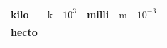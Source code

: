 {\begin{tabular}[t]{|l|l|l|l|l|l|}
        
                \textbf{kilo}
               &
    
    
        k &
    
    
        
                \begin{math}{10}^{3}\end{math}
               &
    
    
        
                \textbf{milli}
               &
    
    
        m &
    
    
        
                \begin{math}{10}^{-3}\end{math}
     \tabularnewline\cline{1-1}\cline{2-2}\cline{3-3}\cline{4-4}\cline{5-5}\cline{6-6}
    
    
        
                \textbf{hecto}
               &
    

\end{tabular}}
